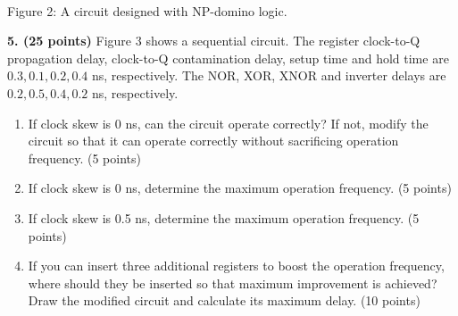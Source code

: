 \documentclass[10pt]{article}
\newcommand{\mos}[4]{\begin{scope}[shift={(#1,#2)}]
\draw (0,.24)--(0,-.24);\draw (0,.20)--(.25,.20)--(.25,.5);
\draw (0,-.20)--(.25,-.20)--(.25,-.5);\draw (-.16,.23)--(-.16,-.23);
\ifnum#4=1\draw (-.26,0) circle (.06);\draw (-.75,0)--(-.32,0);\else\draw (-.75,0)--(-.16,0);\fi
\node[anchor=east,font=\scriptsize] at (-.76,0) {$#3$};\end{scope}}
\newcommand{\ground}[2]{\draw (#1,#2)--(#1,{#2-.12});\draw ({#1-.17},{#2-.12})--({#1+.17},{#2-.12});\draw ({#1-.11},{#2-.20})--({#1+.11},{#2-.20});}
\newcommand{\rail}[3]{\draw (#1,#2)--(#1,{#2+.14});\node[above,font=\scriptsize] at (#1,{#2+.14}) {$#3$};}
\begin{document}
\begin{center}\\Figure 2: A circuit designed with NP-domino logic.\end{center}
\textbf{5. (25 points)} Figure 3 shows a sequential circuit. The register clock-to-Q propagation delay, clock-to-Q contamination delay, setup time and hold time are $0.3,0.1,0.2,0.4$ ns, respectively. The NOR, XOR, XNOR and inverter delays are $0.2,0.5,0.4,0.2$ ns, respectively.
\begin{enumerate}[label=(\alph*),leftmargin=7mm]
\item If clock skew is 0 ns, can the circuit operate correctly? If not, modify the circuit so that it can operate correctly without sacrificing operation frequency. (5 points)
\item If clock skew is 0 ns, determine the maximum operation frequency. (5 points)
\item If clock skew is 0.5 ns, determine the maximum operation frequency. (5 points)
\item If you can insert three additional registers to boost the operation frequency, where should they be inserted so that maximum improvement is achieved? Draw the modified circuit and calculate its maximum delay. (10 points)
\end{enumerate}
\end{document}

